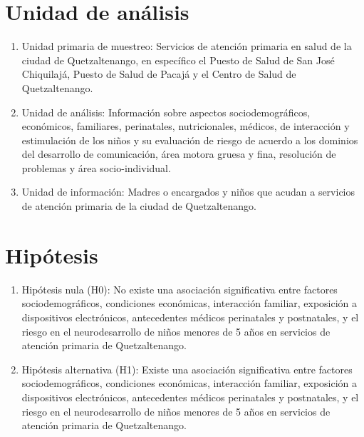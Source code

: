 \documentclass[11pt,letterpaper]{report}
\begin{document}
\section{Unidad de análisis}
	\begin{enumerate}
		\item Unidad primaria de muestreo: Servicios de atención primaria en
		salud de la ciudad de Quetzaltenango, en específico el Puesto de
		Salud de San José Chiquilajá, Puesto de Salud de Pacajá y el Centro de
		Salud de Quetzaltenango.
		\item Unidad de análisis: Información sobre aspectos sociodemográficos,
		económicos, familiares, perinatales, nutricionales, médicos, de
		interacción y estimulación de los niños y su evaluación de riesgo de
		acuerdo a los dominios del desarrollo de comunicación, área motora
		gruesa y fina, resolución de problemas y área socio-individual.
		\item Unidad de información: Madres o encargados y niños que acudan a
		servicios de atención primaria de la ciudad de Quetzaltenango.
	\end{enumerate}

\section{Hipótesis}
	\begin{enumerate}
		\item Hipótesis nula (H0): No existe una asociación significativa entre
		factores sociodemográficos, condiciones económicas, interacción
		familiar, exposición a dispositivos electrónicos, antecedentes médicos
		perinatales y postnatales, y el riesgo en el neurodesarrollo de niños
		menores de 5 años en servicios de atención primaria de Quetzaltenango.
		\item Hipótesis alternativa (H1): Existe una asociación significativa
		entre factores sociodemográficos, condiciones económicas, interacción
		familiar, exposición a dispositivos electrónicos, antecedentes médicos
		perinatales y postnatales, y el riesgo en el neurodesarrollo de niños
		menores de 5 años en servicios de atención primaria de Quetzaltenango.
	\end{enumerate}
\end{document}

